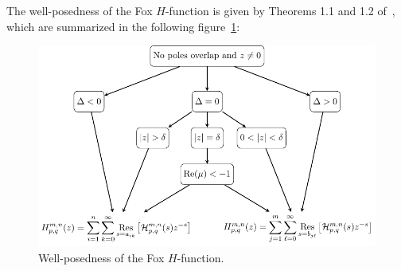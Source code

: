 \documentclass[11pt]{article}
\begin{document}
The well-posedness of the Fox $H$-function is given by Theorems 1.1 and 1.2
of~\cite{kilbas.saigo:04:h-transforms}, which are summarized in the following
figure~\ref{F:Wellposedness}:

\begin{figure}[htp]
  \centering
  \includegraphics[width=1.0\textwidth]{./Well-posedness.pdf}
  \caption{Well-posedness of the Fox $H$-function.}
  \label{F:Wellposedness}
\end{figure}









 
\end{document}

